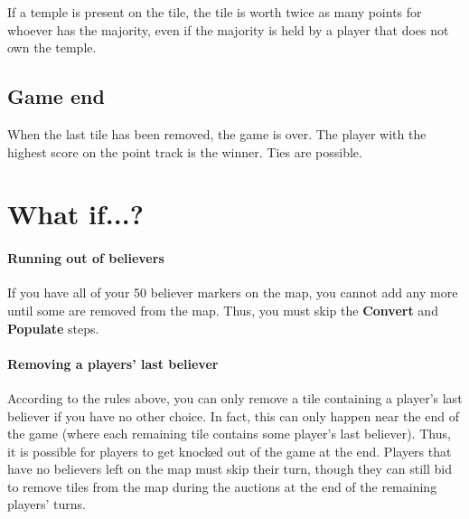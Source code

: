 If a temple is present on the tile, the tile is worth twice as many points for whoever has the majority, even if the majority is held by a player that does not own the temple.

\subsection{Game end}

When the last tile has been removed, the game is over.
The player with the highest score on the point track is the winner.
Ties are possible.


\section{What if...?}

\paragraph{Running out of believers} If you have all of your 50 believer markers on the map, you cannot add any more until some are removed from the map.
Thus, you must skip the {\bf Convert} and {\bf Populate} steps.

\paragraph{Removing a players' last believer} According to the rules above, you can only remove a tile containing a player's last believer if you have no other choice.
In fact, this can only happen near the end of the game (where each remaining tile contains some player's last believer).
Thus, it is possible for players to get knocked out of the game at the end.
Players that have no believers left on the map must skip their turn, though they can still bid to remove tiles from the map during the auctions at the end of the remaining players' turns.
 

